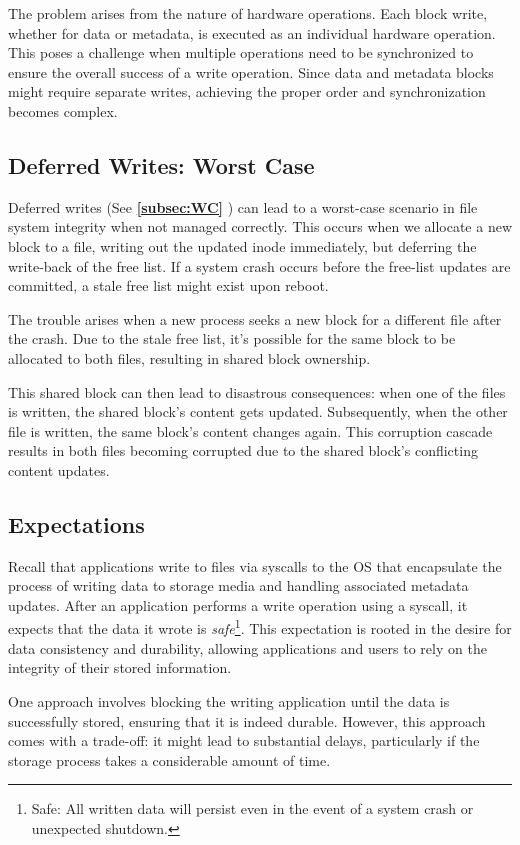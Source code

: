 \documentclass{report}
\newcommand{\exampleBegin}[1]{\begin{tcolorbox}[colback=blue!5!white,colframe=black!75!blue,title={Example:
      #1}]}
\newcommand{\exampleEnd}{\end{tcolorbox}}
\newcommand{\refto}[2]{\textbf{\ref{#1:#2} \nameref{#1:#2}}}
\begin{document}
The problem arises from the nature of hardware operations. Each block write, whether for data or
metadata, is executed as an individual hardware operation. This poses a challenge when multiple
operations need to be synchronized to ensure the overall success of a write operation. Since data
and metadata blocks might require separate writes, achieving the proper order and synchronization
becomes complex. 


\subsection{Deferred Writes: Worst Case}
Deferred writes (See \refto{subsec}{WC}) can lead to a worst-case scenario in file system integrity
when not managed correctly. This occurs when we allocate a new block to a file, writing out the
updated inode immediately, but deferring the write-back of the free list. If a system crash occurs
before the free-list updates are committed, a stale free list might exist upon reboot.

The trouble arises when a new process seeks a new block for a different file after the crash. Due to
the stale free list, it's possible for the same block to be allocated to both files, resulting in
shared block ownership.

This shared block can then lead to disastrous consequences: when one of the files is written, the
shared block's content gets updated. Subsequently, when the other file is written, the same block's
content changes again. This corruption cascade results in both files becoming corrupted due to the
shared block's conflicting content updates.


\subsection{Expectations}
Recall that applications write to files via syscalls to the OS that encapsulate the process of
writing data to storage media and handling associated metadata updates. After an application
performs a write operation using a syscall, it expects that the data it wrote is
\textit{safe}\footnote{Safe: All written data will persist even in the event of a system crash or
unexpected shutdown.}. This expectation is rooted in the desire for data consistency and durability,
allowing applications and users to rely on the integrity of their stored information.

\exampleBegin{Blocked}
One approach involves blocking the writing application until the data is successfully stored,
ensuring that it is indeed durable. However, this approach comes with a trade-off: it might lead to
substantial delays, particularly if the storage process takes a considerable amount of time.
\exampleEnd
\end{document}
